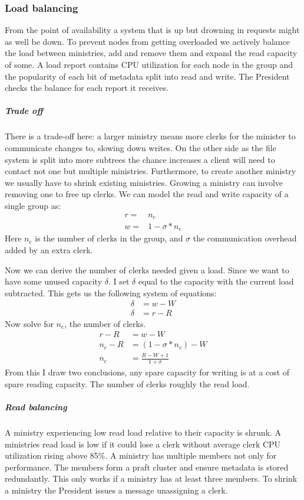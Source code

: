 \subsubsection*{Load balancing} \label{sec:loadb}
From the point of availability a system that is up but drowning in requests might as well be down. To prevent nodes from getting overloaded we actively balance the load between ministries, add and remove them and expand the read capacity of some. A load report contains CPU utilization for each node in the group and the popularity of each bit of metadata split into read and write. The President checks the balance for each report it receives.
%
\subparagraph*{Trade off} \label{sec:tradeoff}
There is a trade-off here: a larger ministry means more clerks for the minister to communicate changes to, slowing down writes. On the other side as the file system is split into more subtrees the chance increases a client will need to contact not one but multiple ministries. Furthermore, to create another ministry we usually have to shrink existing ministries. Growing a ministry can involve removing one to free up clerks. 
%
We can model the read and write capacity of a single group as:
\begin{align}
	r =& n_\text{c} \\
	w =& 1 - \sigma*n_\text{c}
\end{align}%
Here $n_\text{c}$ is the number of clerks in the group, and $\sigma$ the communication overhead added by an extra clerk. 

Now we can derive the number of clerks needed given a load. Since we want to have some unused capacity $\delta$. I set $\delta$ equal to the capacity with the current load subtracted. This gets us the following system of equations: 
\begin{align}
	\delta &= w - W \\
	\delta &= r - R
\end{align}%
Now solve for $n_\text{c}$, the number of clerks.
\begin{align}
	r - R &= w - W \\
	n_c - R &= \left(1 - \sigma*n_c\right) - W \\
	n_c &= \frac{R - W + 1}{1 + \sigma}
\end{align}
From this I draw two conclusions, any spare capacity for writing is at a cost of spare reading capacity. The number of clerks roughly the read load.
%
%
\subparagraph*{Read balancing}
A ministry experiencing low read load relative to their capacity is shrunk. A ministries read load is low if it could lose a clerk without average clerk CPU utilization rising above 85\%. A ministry has multiple members not only for performance. The members form a \ac{praft} cluster and ensure metadata is stored redundantly. This only works if a ministry has at least three members. To shrink a ministry the President issues a \raft{} message unassigning a clerk. 

